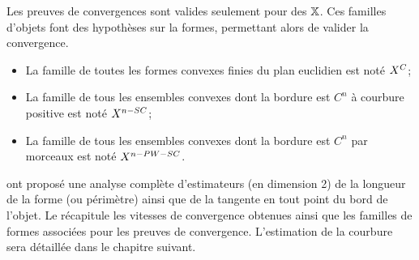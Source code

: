 Les preuves de convergences sont valides seulement pour des 
$\mathbb{X}$. Ces familles d'objets font des hypothèses sur la formes, permettant
alors de valider la convergence.
\begin{itemize}
  \item La famille de toutes les formes convexes finies du plan euclidien est noté $X^{C}$;
  \item La famille de tous les ensembles convexes dont la bordure est $C^n$ à courbure positive est noté $X^{n-SC}$;
  \item La famille de tous les ensembles convexes dont la bordure est $C^n$ par morceaux est noté $X^{n-PW-SC}$.
\end{itemize}
%
%

 ont proposé une analyse
complète d'estimateurs (en dimension 2) de la longueur de la forme (ou
périmètre) ainsi que de la tangente en tout point du bord de l'objet. Le
 récapitule les vitesses de convergence obtenues ainsi
que les familles de formes associées pour les preuves de convergence.
L'estimation de la courbure sera détaillée dans le chapitre suivant.


